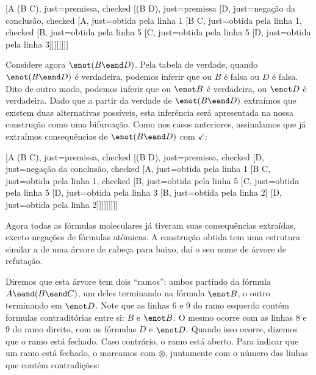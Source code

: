 \begin{center}
\begin{tableau}
	{
	}
	[A \eand (B \eand C), just={premissa}, checked
	[\enot(B \eand D), just={premissa}
	[\enot \enot D, just={negação da conclusão}, checked
	[A, just={obtida pela linha 1}
	[B \eand C, just={obtida pela linha 1}, checked
	[B, just={obtida pela linha 5}
	[C, just={obtida pela linha 5}
	[D, just={obtida pela linha 3}]]]]]]]]
\end{tableau}
\end{center}



Considere agora $\enot(B \eand D)$.  
Pela tabela de verdade, quando $\enot(B \eand D)$ é verdadeira, podemos inferir que ou $B$ é falsa ou $D$ é falsa.
Dito de outro modo, podemos inferir que ou $\enot B$ é verdadeira, ou $\enot D$ é verdadeira.
Dado que a partir da verdade de $\enot(B \eand D)$ extraímos que existem duas alternativas possíveis, esta inferência será apresentada na nossa construção como uma bifurcação. Como nos casos anteriores, assinalamos que já extraímos consequências de $\enot(B \eand D)$  com $\checkmark$:
\begin{center}
\begin{tableau}
	{
	}
	[A \eand (B \eand C), just={premissa}, checked
	[\enot(B \eand D), just={premissa}, checked
	[\enot \enot D, just={negação da conclusão}, checked
	[A, just={obtida pela linha 1}
	[B \eand C, just={obtida pela linha 1}, checked
	[B, just={obtida pela linha 5}
	[C, just={obtida pela linha 5}
	[D, just={obtida pela linha 3}
		[\enot B, just={obtida pela linha 2}]
		[\enot D, just={obtida pela linha 2}]]]]]]]]]
\end{tableau}
\end{center}


Agora todas as fórmulas moleculares já tiveram suas consequências extraídas, exceto negações de fórmulas atômicas. 
A construção obtida tem uma estrutura similar a de uma árvore de cabeça para baixo, daí o seu nome de árvore de refutação.

Diremos que esta árvore tem dois ``ramos'': ambos partindo da fórmula $A \eand (B \eand C)$, um deles terminando na fórmula $\enot B$, o outro terminando em $\enot D$.
Note que as linhas 6 e 9 do ramo esquerdo contém formulas contraditórias entre si: $B$ e $\enot B$.
O mesmo ocorre com as linhas 8 e 9 do ramo direito, com as fórmulas $D$ e $\enot D$.
Quando isso ocorre, dizemos que o ramo está fechado.
Caso contrário, o ramo está aberto.
Para indicar que um ramo está fechado, o marcamos com $\otimes$, juntamente com o número das linhas que contém contradições:

